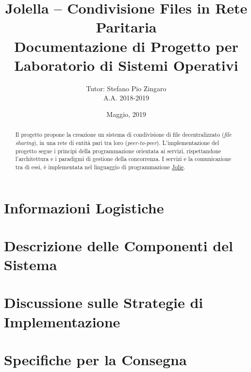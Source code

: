 \documentclass{article}
\title{%
  Jolella -- Condivisione Files in Rete Paritaria\\
  \large Documentazione di Progetto per Laboratorio di Sistemi Operativi}
\author{%
  Tutor: Stefano Pio Zingaro\\
  A.A. 2018-2019}
\date{Maggio, 2019}
\begin{document}
\maketitle

\begin{abstract}

 Il progetto propone la creazione un sistema di condivisione di file
 decentralizzato (\textit{file sharing}), in una rete di entità pari tra loro
 (\textit{peer-to-peer}). L'implementazione del progetto segue i principi della
 programmazione orientata ai servizi, rispettandone l'architettura e i paradigmi
 di gestione della concorrenza. I servizi e la comunicazione tra di essi, è
 implementata nel linguaggio di programmazione
 \href{http://jolie-lang.org}{Jolie}.

\end{abstract}

\newpage

\tableofcontents

\newpage

\section{Informazioni Logistiche}
\label{sec:logistic}


\section{Descrizione delle Componenti del Sistema}
\label{sec:components}


\section{Discussione sulle Strategie di Implementazione}
\label{sec:implementation}


\section{Specifiche per la Consegna}
\label{sec:delivery}




\end{document}
